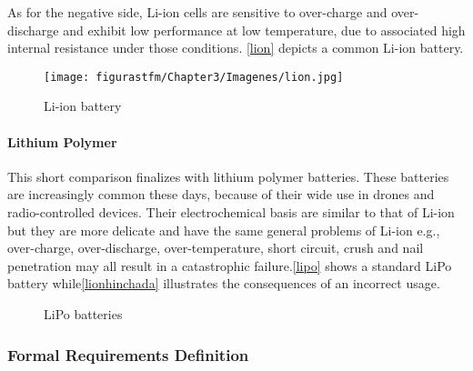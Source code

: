 As for the negative side, Li-ion cells are sensitive to over-charge and over-discharge and exhibit low performance at low temperature, due to associated high internal resistance under those conditions. \autoref{lion} depicts a common Li-ion battery.

			\begin{figure} [H] 				
				\centering
				\texttt{[image: figurastfm/Chapter3/Imagenes/lion.jpg]}
				\caption{Li-ion battery \cite{sparkfun}} \label{lion}
				\vspace{-2cm}
			\end{figure}
\newpage
\paragraph{Lithium Polymer}

This short comparison finalizes with lithium polymer batteries. These batteries are increasingly common these days, because of their wide use in drones and radio-controlled devices. Their electrochemical basis are similar to that of Li-ion but they are more delicate and have the same general problems of Li-ion e.g., over-charge, over-discharge, over-temperature, short circuit, crush and nail penetration may all result in a catastrophic failure.\autoref{lipo} shows a standard LiPo battery while\autoref{lionhinchada} illustrates the consequences of an incorrect usage.

			\begin{figure}[H]
			\centering
			 \quad
			\caption{LiPo batteries} 
\end{figure}

\subsubsection{Formal Requirements Definition}
			
